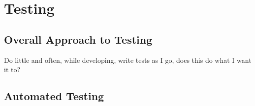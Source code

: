 \section{Testing}

\subsection{Overall Approach to Testing}

Do little and often, while developing, write tests as I go, does this do what I want it to?

\subsection{Automated Testing}

